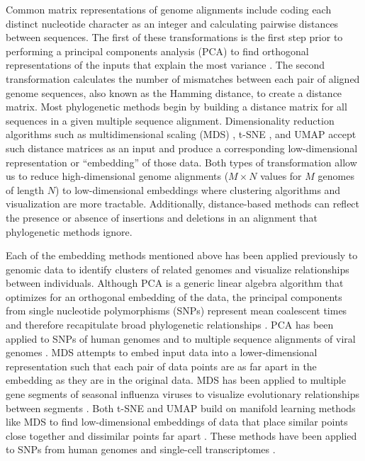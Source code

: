 \documentclass[10pt,letterpaper]{article}
\begin{document}
Common matrix representations of genome alignments include coding each distinct nucleotide character as an integer and calculating pairwise distances between sequences.
The first of these transformations is the first step prior to performing a principal components analysis (PCA) to find orthogonal representations of the inputs that explain the most variance \cite{mcvean_2009}.
The second transformation calculates the number of mismatches between each pair of aligned genome sequences, also known as the Hamming distance, to create a distance matrix.
Most phylogenetic methods begin by building a distance matrix for all sequences in a given multiple sequence alignment.
Dimensionality reduction algorithms such as multidimensional scaling (MDS) \cite{hout_papesh_goldinger_2012}, t-SNE \cite{maaten2008visualizing}, and UMAP \cite{lel2018umap} accept such distance matrices as an input and produce a corresponding low-dimensional representation or ``embedding'' of those data.
Both types of transformation allow us to reduce high-dimensional genome alignments ($M \times N$ values for $M$ genomes of length $N$) to low-dimensional embeddings where clustering algorithms and visualization are more tractable.
Additionally, distance-based methods can reflect the presence or absence of insertions and deletions in an alignment that phylogenetic methods ignore.

Each of the embedding methods mentioned above has been applied previously to genomic data to identify clusters of related genomes and visualize relationships between individuals.
Although PCA is a generic linear algebra algorithm that optimizes for an orthogonal embedding of the data, the principal components from single nucleotide polymorphisms (SNPs) represent mean coalescent times and therefore recapitulate broad phylogenetic relationships \cite{mcvean_2009}.
PCA has been applied to SNPs of human genomes \cite{novembre_2008,alexander_2009,mcvean_2009,auton_2015} and to multiple sequence alignments of viral genomes \cite{metsky_2017}.
MDS attempts to embed input data into a lower-dimensional representation such that each pair of data points are as far apart in the embedding as they are in the original data.
MDS has been applied to multiple gene segments of seasonal influenza viruses to visualize evolutionary relationships between segments \cite{rambaut_2008}.
Both t-SNE and UMAP build on manifold learning methods like MDS to find low-dimensional embeddings of data that place similar points close together and dissimilar points far apart \cite{kobak_2021}.
These methods have been applied to SNPs from human genomes \cite{diaz-papkovich_2019} and single-cell transcriptomes \cite{becht_2018,kobak_2019}.
\end{document}
